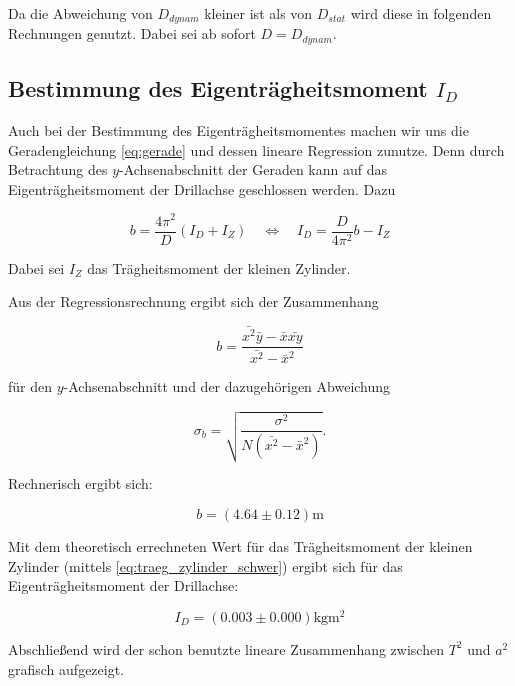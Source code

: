 Da die Abweichung von $D_{dynam}$ kleiner ist als von $D_{stat}$ wird
diese in folgenden Rechnungen genutzt.
Dabei sei ab sofort $D=D_{dynam}$.


\subsection{Bestimmung des Eigenträgheitsmoment $I_D$}

Auch bei der Bestimmung des Eigenträgheitsmomentes machen wir uns die
Geradengleichung \eqref{eq:gerade} und dessen lineare Regression zunutze.
Denn durch Betrachtung des $y$-Achsenabschnitt der Geraden kann auf das Eigenträgheitsmoment der Drillachse geschlossen werden. %
Dazu

\begin{equation*}
b=\frac{4\pi^2}{D}\left(I_D+I_Z\right) \quad \Leftrightarrow \quad I_D=\frac{D}{4\pi^2}b-I_Z
\end{equation*}

Dabei sei $I_Z$ das Trägheitsmoment der kleinen Zylinder.%

Aus der Regressionsrechnung ergibt sich der Zusammenhang

\begin{equation*}
b=\frac{\bar{x^2}\bar{y}-\bar{x}\bar{xy}}{\bar{x^2}-\bar{x}^2}
\end{equation*}

für den $y$-Achsenabschnitt und der dazugehörigen Abweichung

\begin{equation*}
\sigma_b=\sqrt{\frac{\sigma^2}{N\left(\bar{x^2}-\bar{x}^2\right)}}.
\end{equation*}

Rechnerisch ergibt sich:

\begin{equation}
\label{eq:y_achsenabschnitt}
b=\left(\num{4.64}\pm\num{0.12}\right) \si{\meter}
\end{equation}

Mit dem theoretisch errechneten Wert für das Trägheitsmoment der kleinen Zylinder
(mittels \eqref{eq:traeg_zylinder_schwer}) ergibt sich für das
Eigenträgheitsmoment der Drillachse:

\begin{equation}
\label{eq:eigentraegheitsmoment}
I_D=\left(\num{0.003}\pm\num{0.000}\right) \si{\kilogram\meter\squared}
\end{equation}


Abschließend wird der schon benutzte lineare Zusammenhang zwischen $T^2$ und $a^2$ grafisch aufgezeigt.

